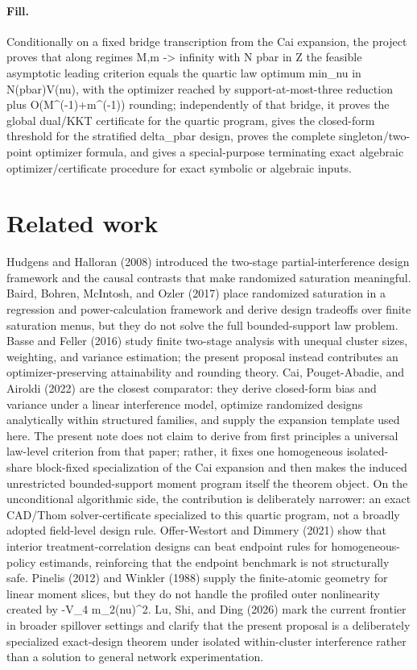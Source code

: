 \documentclass{article}
\begin{document}
\paragraph{Fill.} Conditionally on a fixed bridge transcription from the Cai expansion, the project proves that along regimes M,m -> infinity with N pbar in Z the feasible asymptotic leading criterion equals the quartic law optimum min_{nu in N(pbar)}V(nu), with the optimizer reached by support-at-most-three reduction plus O(M^(-1)+m^(-1)) rounding; independently of that bridge, it proves the global dual/KKT certificate for the quartic program, gives the closed-form threshold for the stratified delta_pbar design, proves the complete singleton/two-point optimizer formula, and gives a special-purpose terminating exact algebraic optimizer/certificate procedure for exact symbolic or algebraic inputs.

\section{Related work}

Hudgens and Halloran (2008) introduced the two-stage partial-interference design framework and the causal contrasts that make randomized saturation meaningful. Baird, Bohren, McIntosh, and Ozler (2017) place randomized saturation in a regression and power-calculation framework and derive design tradeoffs over finite saturation menus, but they do not solve the full bounded-support law problem. Basse and Feller (2016) study finite two-stage analysis with unequal cluster sizes, weighting, and variance estimation; the present proposal instead contributes an optimizer-preserving attainability and rounding theory. Cai, Pouget-Abadie, and Airoldi (2022) are the closest comparator: they derive closed-form bias and variance under a linear interference model, optimize randomized designs analytically within structured families, and supply the expansion template used here. The present note does not claim to derive from first principles a universal law-level criterion from that paper; rather, it fixes one homogeneous isolated-share block-fixed specialization of the Cai expansion and then makes the induced unrestricted bounded-support moment program itself the theorem object. On the unconditional algorithmic side, the contribution is deliberately narrower: an exact CAD/Thom solver-certificate specialized to this quartic program, not a broadly adopted field-level design rule. Offer-Westort and Dimmery (2021) show that interior treatment-correlation designs can beat endpoint rules for homogeneous-policy estimands, reinforcing that the endpoint benchmark is not structurally safe. Pinelis (2012) and Winkler (1988) supply the finite-atomic geometry for linear moment slices, but they do not handle the profiled outer nonlinearity created by -V_4 m_2(nu)^2. Lu, Shi, and Ding (2026) mark the current frontier in broader spillover settings and clarify that the present proposal is a deliberately specialized exact-design theorem under isolated within-cluster interference rather than a solution to general network experimentation.
\end{document}
